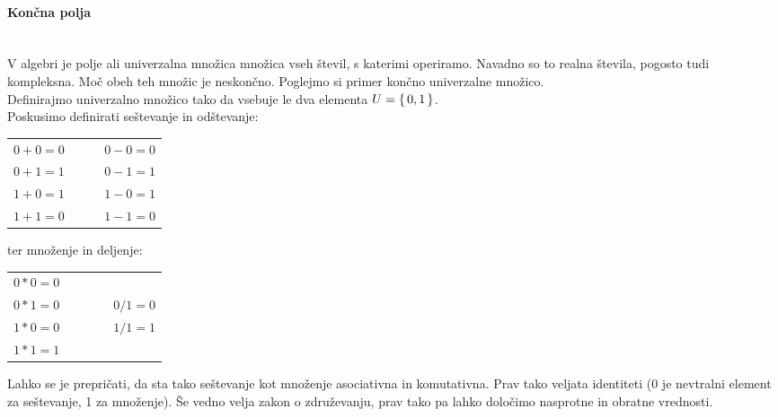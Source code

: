 \documentclass[12pt]{article}
\begin{document}
            \paragraph{Končna polja} \label{sec:polja} \mbox{}\\
                V algebri je polje ali univerzalna množica množica vseh števil,
                s katerimi operiramo. Navadno so to realna števila, pogosto tudi
                kompleksna. Moč obeh teh množic je neskončno. Poglejmo si primer
                končno univerzalne množico. \\
                Definirajmo univerzalno množico tako 
                da vsebuje le dva elementa $U = \set{0, 1}$.\\
                Poskusimo definirati seštevanje in odštevanje:
                \begin{table}[h!]
                    \centering
                    \begin{tabular}{l p{0.2\linewidth}}
                        $0 + 0 = 0$  & $0 - 0 = 0$ \\
                        $0 + 1 = 1$  & $0 - 1 = 1$ \\
                        $1 + 0 = 1$  & $1 - 0 = 1$ \\
                        $1 + 1 = 0$  & $1 - 1 = 0$ \\
                    \end{tabular}
                \end{table}

                ter množenje in deljenje:
                \begin{table}[h!]
                    \centering
                    \begin{tabular}{l p{0.2\linewidth}}
                        $0 * 0 = 0$  &  \\
                        $0 * 1 = 0$  & $0 / 1 = 0$\\
                        $1 * 0 = 0$  & $1 / 1 = 1$\\
                        $1 * 1 = 1$  &  \\
                    \end{tabular}
                \end{table}

                Lahko se je prepričati, da sta tako seštevanje kot množenje
                asociativna in komutativna. Prav tako veljata identiteti (0 je 
                nevtralni element za seštevanje, 1 za množenje). Še vedno velja 
                zakon o združevanju, prav tako pa lahko določimo nasprotne in 
                obratne vrednosti. 
            
\end{document}
